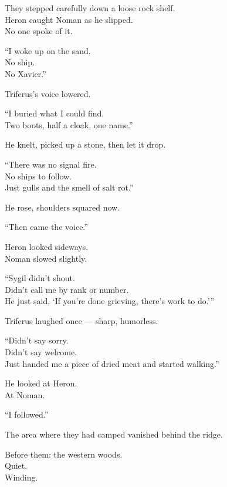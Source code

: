 \documentclass[12pt]{article}
\begin{document}
They stepped carefully down a loose rock shelf.\\
Heron caught Noman as he slipped.\\
No one spoke of it.

\vspace{1em}

“I woke up on the sand.\\
No ship.\\
No Xavier.”

Triferus’s voice lowered.

“I buried what I could find.\\
Two boots, half a cloak, one name.”

He knelt, picked up a stone, then let it drop.

“There was no signal fire.\\
No ships to follow.\\
Just gulls and the smell of salt rot.”

\vspace{1em}

He rose, shoulders squared now.

“Then came the voice.”

\vspace{1em}

Heron looked sideways.\\
Noman slowed slightly.

“Sygil didn’t shout.\\
Didn’t call me by rank or number.\\
He just said, ‘If you’re done grieving, there’s work to do.’”

\vspace{1em}

Triferus laughed once — sharp, humorless.

“Didn’t say sorry.\\
Didn’t say welcome.\\
Just handed me a piece of dried meat and started walking.”

He looked at Heron.\\
At Noman.

“I followed.”

\vspace{1em}

The area where they had camped vanished behind the ridge.

Before them: the western woods.\\
Quiet.\\
Winding.
\end{document}
